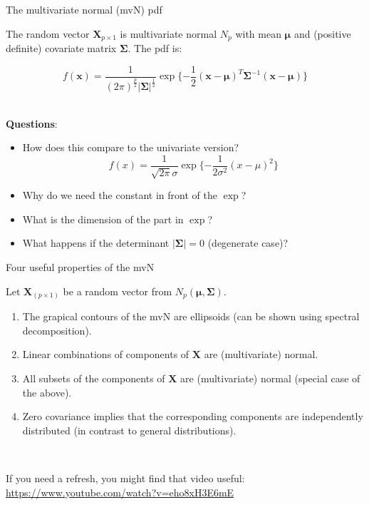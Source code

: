 \documentclass[
  ignorenonframetext,
]{beamer}
\begin{document}
\begin{frame}
\begin{block}{The multivariate normal (mvN) pdf}
\protect\hypertarget{the-multivariate-normal-mvn-pdf}{}
\vspace{2mm}

The random vector \(\boldsymbol{X}_{p\times 1}\) is multivariate normal
\(N_p\) with mean \(\boldsymbol{\mu}\) and (positive definite) covariate
matrix \(\boldsymbol\Sigma\). The pdf is:

\[f(\boldsymbol{x})=\frac{1}{(2\pi)^\frac{p}{2}|\boldsymbol\Sigma|^\frac{1}{2}} \exp\{-\frac{1}{2}(\boldsymbol{x}-\boldsymbol{\mu})^T\boldsymbol\Sigma^{-1}(\boldsymbol{x}-\boldsymbol{\mu})\}\]
\(~\)

\textbf{Questions}:

\begin{itemize}
\item
  How does this compare to the univariate version?
  \[f(x)=\frac{1}{\sqrt{2\pi}\sigma}\exp\{- \frac{1}{2\sigma^2}(x-\mu)^2\}\]
\item
  Why do we need the constant in front of the \(\exp\)?
\item
  What is the dimension of the part in \(\exp\)?
\item
  What happens if the determinant \(|\boldsymbol\Sigma| = 0\)
  (degenerate case)?
\end{itemize}
\end{block}
\end{frame}

\begin{frame}
\begin{block}{Four useful properties of the mvN}
\protect\hypertarget{four-useful-properties-of-the-mvn}{}
\vspace{2mm}

Let \(\boldsymbol{X}_{(p\times 1)}\) be a random vector from
\(N_p(\boldsymbol{\mu},\boldsymbol\Sigma)\).

\vspace{2mm}

\begin{enumerate}
\item
  The grapical contours of the mvN are ellipsoids (can be shown using
  spectral decomposition).
\item
  Linear combinations of components of \(\boldsymbol{X}\) are
  (multivariate) normal.
\item
  All subsets of the components of \(\boldsymbol{X}\) are (multivariate)
  normal (special case of the above).
\item
  Zero covariance implies that the corresponding components are
  independently distributed (in contrast to general distributions).
\end{enumerate}

\(~\)

\small

If you need a refresh, you might find that video useful:
\url{https://www.youtube.com/watch?v=eho8xH3E6mE}
\end{block}
\end{frame}
\end{document}
